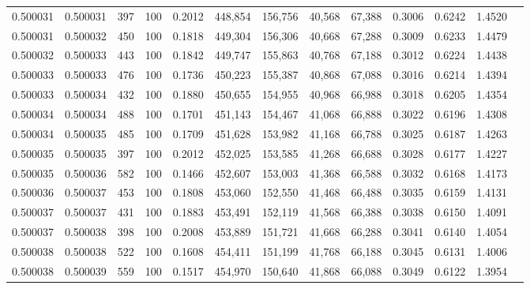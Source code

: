 \begin{tabular}{rrrrrrrrrrrrr}
0.500031 & 0.500031 &   397 & 100 &                                     0.2012 & 448,854 & 156,756 &  40,568 &  67,388 & 0.3006 & 0.6242 & 1.4520 \\
0.500031 & 0.500032 &   450 & 100 &                                     0.1818 & 449,304 & 156,306 &  40,668 &  67,288 & 0.3009 & 0.6233 & 1.4479 \\
0.500032 & 0.500033 &   443 & 100 &                                     0.1842 & 449,747 & 155,863 &  40,768 &  67,188 & 0.3012 & 0.6224 & 1.4438 \\
0.500033 & 0.500033 &   476 & 100 &                                     0.1736 & 450,223 & 155,387 &  40,868 &  67,088 & 0.3016 & 0.6214 & 1.4394 \\
0.500033 & 0.500034 &   432 & 100 &                                     0.1880 & 450,655 & 154,955 &  40,968 &  66,988 & 0.3018 & 0.6205 & 1.4354 \\
0.500034 & 0.500034 &   488 & 100 &                                     0.1701 & 451,143 & 154,467 &  41,068 &  66,888 & 0.3022 & 0.6196 & 1.4308 \\
0.500034 & 0.500035 &   485 & 100 &                                     0.1709 & 451,628 & 153,982 &  41,168 &  66,788 & 0.3025 & 0.6187 & 1.4263 \\
0.500035 & 0.500035 &   397 & 100 &                                     0.2012 & 452,025 & 153,585 &  41,268 &  66,688 & 0.3028 & 0.6177 & 1.4227 \\
0.500035 & 0.500036 &   582 & 100 &                                     0.1466 & 452,607 & 153,003 &  41,368 &  66,588 & 0.3032 & 0.6168 & 1.4173 \\
0.500036 & 0.500037 &   453 & 100 &                                     0.1808 & 453,060 & 152,550 &  41,468 &  66,488 & 0.3035 & 0.6159 & 1.4131 \\
0.500037 & 0.500037 &   431 & 100 &                                     0.1883 & 453,491 & 152,119 &  41,568 &  66,388 & 0.3038 & 0.6150 & 1.4091 \\
0.500037 & 0.500038 &   398 & 100 &                                     0.2008 & 453,889 & 151,721 &  41,668 &  66,288 & 0.3041 & 0.6140 & 1.4054 \\
0.500038 & 0.500038 &   522 & 100 &                                     0.1608 & 454,411 & 151,199 &  41,768 &  66,188 & 0.3045 & 0.6131 & 1.4006 \\
0.500038 & 0.500039 &   559 & 100 &                                     0.1517 & 454,970 & 150,640 &  41,868 &  66,088 & 0.3049 & 0.6122 & 1.3954 \\

\end{tabular}
